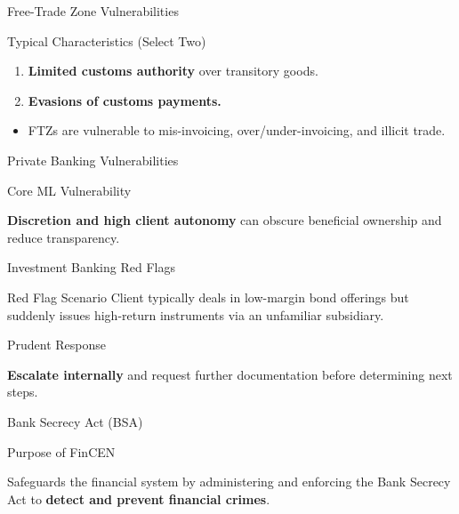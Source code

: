 \documentclass{beamer}
\begin{document}
	\begin{frame}{Free-Trade Zone Vulnerabilities}
		\begin{block}{Typical Characteristics (Select Two)}
			\begin{enumerate}
				\item \textbf{Limited customs authority} over transitory goods.
				\item \textbf{Evasions of customs payments.}
			\end{enumerate}
		\end{block}
		\begin{itemize}
			\item FTZs are vulnerable to mis-invoicing, over/under-invoicing, and illicit trade.
		\end{itemize}
	\end{frame}
	
	\begin{frame}{Private Banking Vulnerabilities}
		\begin{block}{Core ML Vulnerability}
			\begin{center}
				\textbf{Discretion and high client autonomy} can obscure beneficial ownership and reduce transparency.
			\end{center}
		\end{block}
	\end{frame}
	
	\begin{frame}{Investment Banking Red Flags}
		\begin{block}{Red Flag Scenario}
			Client typically deals in low-margin bond offerings but suddenly issues high-return instruments via an unfamiliar subsidiary.
		\end{block}
		\begin{block}{Prudent Response}
			\begin{center}
				\textbf{Escalate internally} and request further documentation before determining next steps.
			\end{center}
		\end{block}
	\end{frame}
	
	\begin{frame}{Bank Secrecy Act (BSA)}
		\begin{block}{Purpose of FinCEN}
			\begin{center}
				Safeguards the financial system by administering and enforcing the Bank Secrecy Act to \textbf{detect and prevent financial crimes}.
			\end{center}
		\end{block}
	\end{frame}
	
\end{document}
